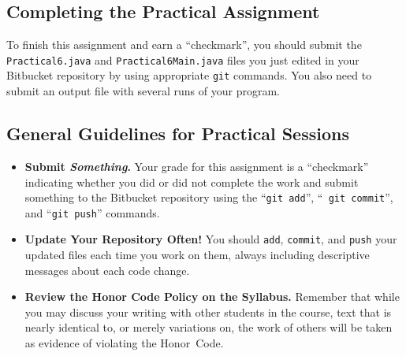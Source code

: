 \vspace*{-.15in}
\subsection*{Completing the Practical Assignment}
\vspace*{-.1in}
To finish this assignment and earn a ``checkmark'', you should 
submit the {\tt Practical6.java} and {\tt Practical6Main.java} files you just edited
in your Bitbucket repository by
using appropriate {\tt git} commands. You also need to submit an output file with several runs of your program.

\vspace*{-.15in}
\subsection*{General Guidelines for Practical Sessions}
\vspace*{-.05in}
\begin{itemize}
\item {\bf Submit \textbf{\textit{Something}}.} Your grade for this assignment is a ``checkmark'' indicating whether you
  did or did not complete the work and submit something to the Bitbucket repository using the ``{\tt git add}'', ``{\tt
    git commit}'', and ``{\tt git push}'' commands.

\item {\bf Update Your Repository Often!} You should {\tt add}, {\tt commit}, and {\tt push} your updated files each
  time you work on them, always including descriptive messages about each code change.

\item {\bf Review the Honor Code Policy on the Syllabus.} Remember that while you may discuss your writing with other
  students in the course, text that is nearly identical to, or merely variations on, the work of others will be
  taken as evidence of violating the \mbox{Honor Code}.
\end{itemize}



